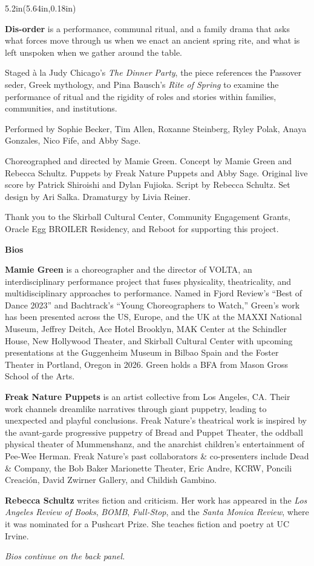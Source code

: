 \documentclass[10pt,letterpaper,landscape]{article}
\newcommand{\panelblock}[3]{%
  \begin{textblock*}{#1}(#2,#3)
    \begin{minipage}[t][8.14in][t]{#1}
      \raggedright
}
\newcommand{\panelblockend}{%
    \end{minipage}
  \end{textblock*}
}
\begin{document}
\panelblock{5.2in}{5.64in}{0.18in}
{\fontsize{6.1}{6.8}\selectfont
\textbf{Dis-order} is a performance, communal ritual, and a family drama that asks what forces move through us when we enact an ancient spring rite, and what is left unspoken when we gather around the table.

Staged à la Judy Chicago's \textit{The Dinner Party}, the piece references the Passover seder, Greek mythology, and Pina Bausch's \textit{Rite of Spring} to examine the performance of ritual and the rigidity of roles and stories within families, communities, and institutions.

Performed by Sophie Becker, Tim Allen, Roxanne Steinberg, Ryley Polak, Anaya Gonzales, Nico Fife, and Abby Sage.

Choreographed and directed by Mamie Green. Concept by Mamie Green and Rebecca Schultz. Puppets by Freak Nature Puppets and Abby Sage. Original live score by Patrick Shiroishi and Dylan Fujioka. Script by Rebecca Schultz. Set design by Ari Salka. Dramaturgy by Livia Reiner.

Thank you to the Skirball Cultural Center, Community Engagement Grants, Oracle Egg BROILER Residency, and Reboot for supporting this project.

\textbf{Bios}

\fontsize{5.0}{5.45}\selectfont
\textbf{Mamie Green} is a choreographer and the director of VOLTA, an interdisciplinary performance project that fuses physicality, theatricality, and multidisciplinary approaches to performance. Named in Fjord Review's ``Best of Dance 2023'' and Bachtrack's ``Young Choreographers to Watch,'' Green's work has been presented across the US, Europe, and the UK at the MAXXI National Museum, Jeffrey Deitch, Ace Hotel Brooklyn, MAK Center at the Schindler House, New Hollywood Theater, and Skirball Cultural Center with upcoming presentations at the Guggenheim Museum in Bilbao Spain and the Foster Theater in Portland, Oregon in 2026. Green holds a BFA from Mason Gross School of the Arts.

\textbf{Freak Nature Puppets} is an artist collective from Los Angeles, CA. Their work channels dreamlike narratives through giant puppetry, leading to unexpected and playful conclusions. Freak Nature's theatrical work is inspired by the avant-garde progressive puppetry of Bread and Puppet Theater, the oddball physical theater of Mummenshanz, and the anarchist children's entertainment of Pee-Wee Herman. Freak Nature's past collaborators \& co-presenters include Dead \& Company, the Bob Baker Marionette Theater, Eric Andre, KCRW, Poncili Creación, David Zwirner Gallery, and Childish Gambino.

\textbf{Rebecca Schultz} writes fiction and criticism. Her work has appeared in the \textit{Los Angeles Review of Books}, \textit{BOMB}, \textit{Full-Stop}, and the \textit{Santa Monica Review}, where it was nominated for a Pushcart Prize. She teaches fiction and poetry at UC Irvine.

\textit{Bios continue on the back panel.}
}
\panelblockend
\end{document}
